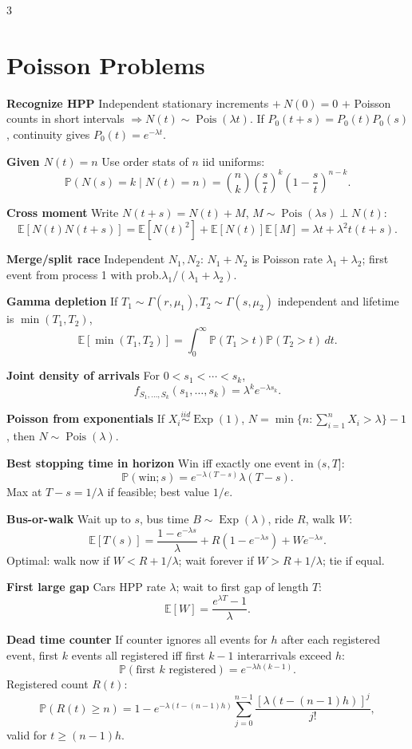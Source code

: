\documentclass[a4paper,8pt,fleqn]{extarticle}
\newcommand{\E}{\mathbb{E}}
\newcommand{\PP}{\mathbb{P}}
\newcommand{\1}{\mathbf{1}}
\newcommand{\sub}[1]{\textbf{#1} }
\DeclareMathOperator{\Pois}{Pois}
\DeclareMathOperator{\Exp}{Exp}
\begin{document}
\begin{multicols}{3}
\section*{Poisson Problems}
\sub{Recognize HPP} Independent stationary increments \(+\ N(0)=0\) \(+\) Poisson counts in short intervals \(\Rightarrow N(t)\sim \Pois(\lambda t)\). If \(P_0(t+s)=P_0(t)P_0(s)\), continuity gives \(P_0(t)=e^{-\lambda t}\).

\sub{Given \(N(t)=n\)} Use order stats of \(n\) iid uniforms:
\[
\PP(N(s)=k\mid N(t)=n)=\binom{n}{k}\left(\frac{s}{t}\right)^k\left(1-\frac{s}{t}\right)^{n-k}.
\]

\sub{Cross moment} Write \(N(t+s)=N(t)+M\), \(M\sim \Pois(\lambda s)\perp N(t)\):
\[
\E[N(t)N(t+s)]=\E[N(t)^2]+\E[N(t)]\E[M]=\lambda t+\lambda^2 t(t+s).
\]

\sub{Merge/split race} Independent \(N_1,N_2\): \(N_1+N_2\) is Poisson rate \(\lambda_1+\lambda_2\); first event from process 1 with prob.\(\lambda_1/(\lambda_1+\lambda_2)\).

\sub{Gamma depletion} If \(T_1\sim \Gamma(r,\mu_1),T_2\sim \Gamma(s,\mu_2)\) independent and lifetime is \(\min(T_1,T_2)\),
\[
\E[\min(T_1,T_2)]=\int_0^\infty \PP(T_1>t)\PP(T_2>t)\,dt.
\]

\sub{Joint density of arrivals} For \(0<s_1<\cdots<s_k\),
\[
f_{S_1,\dots,S_k}(s_1,\dots,s_k)=\lambda^k e^{-\lambda s_k}.
\]

\sub{Poisson from exponentials} If \(X_i\stackrel{iid}{\sim}\Exp(1)\), \(N=\min\{n:\sum_{i=1}^n X_i>\lambda\}-1\), then \(N\sim \Pois(\lambda)\).

\sub{Best stopping time in horizon} Win iff exactly one event in \((s,T]\):
\[
\PP(\text{win};s)=e^{-\lambda(T-s)}\lambda(T-s).
\]
Max at \(T-s=1/\lambda\) if feasible; best value \(1/e\).

\sub{Bus-or-walk} Wait up to \(s\), bus time \(B\sim \Exp(\lambda)\), ride \(R\), walk \(W\):
\[
\E[T(s)]=\frac{1-e^{-\lambda s}}{\lambda}+R(1-e^{-\lambda s})+We^{-\lambda s}.
\]
Optimal: walk now if \(W<R+1/\lambda\); wait forever if \(W>R+1/\lambda\); tie if equal.

\sub{First large gap} Cars HPP rate \(\lambda\); wait to first gap of length \(T\):
\[
\E[W]=\frac{e^{\lambda T}-1}{\lambda}.
\]

\sub{Dead time counter} If counter ignores all events for \(h\) after each registered event, first \(k\) events all registered iff first \(k-1\) interarrivals exceed \(h\):
\[
\PP(\text{first }k\text{ registered})=e^{-\lambda h(k-1)}.
\]
Registered count \(R(t)\):
\[
\PP(R(t)\ge n)=1-e^{-\lambda(t-(n-1)h)}\sum_{j=0}^{n-1}\frac{[\lambda(t-(n-1)h)]^j}{j!},
\]
valid for \(t\ge (n-1)h\).


\end{multicols}
\end{document}
